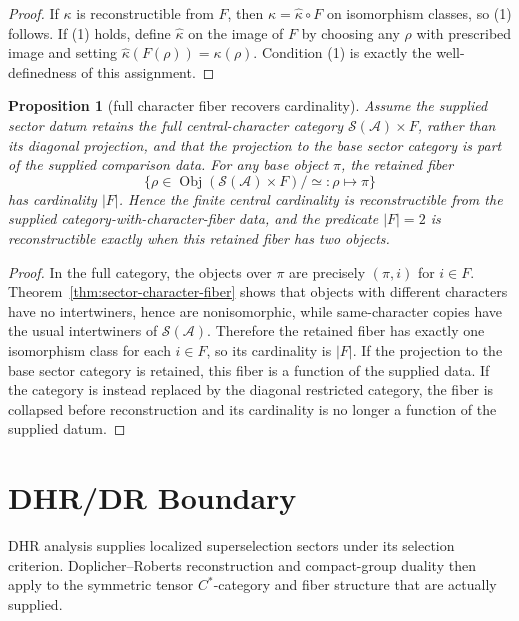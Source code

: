 \documentclass[12pt]{article}
\newtheorem{proposition}{Proposition}
\theoremstyle{remark}
\newcommand{\A}{\mathcal A}
\newcommand{\Obj}{\operatorname{Obj}}
\newcommand{\Sectors}{\mathcal S}
\begin{document}
\begin{proof}
If \(\kappa\) is reconstructible from \(F\), then
\(\kappa=\widehat\kappa\circ F\) on isomorphism classes, so (1) follows.  If
(1) holds, define \(\widehat\kappa\) on the image of \(F\) by choosing any
\(\rho\) with prescribed image and setting
\(\widehat\kappa(F(\rho))=\kappa(\rho)\).  Condition (1) is exactly the
well-definedness of this assignment.
\end{proof}

\begin{proposition}[full character fiber recovers cardinality]
\label{prop:full-character-fiber}
Assume the supplied sector datum retains the full central-character category
\(\Sectors(\A)\times F\), rather than its diagonal projection, and that the
projection to the base sector category is part of the supplied comparison
data.  For any base object \(\pi\), the retained fiber
\[
  \{\rho\in\Obj(\Sectors(\A)\times F)/{\simeq}:\rho\mapsto\pi\}
\]
has cardinality \(|F|\).  Hence the finite central cardinality is
reconstructible from the supplied category-with-character-fiber data, and the
predicate \(|F|=2\) is reconstructible exactly when this retained fiber has
two objects.
\end{proposition}

\begin{proof}
In the full category, the objects over \(\pi\) are precisely \((\pi,i)\) for
\(i\in F\).  Theorem~\ref{thm:sector-character-fiber} shows that objects with
different characters have no intertwiners, hence are nonisomorphic, while
same-character copies have the usual intertwiners of \(\Sectors(\A)\).
Therefore the retained fiber has exactly one isomorphism class for each
\(i\in F\), so its cardinality is \(|F|\).  If the projection to the base
sector category is retained, this fiber is a function of the supplied data.  If
the category is instead replaced by the diagonal restricted category, the fiber
is collapsed before reconstruction and its cardinality is no longer a function
of the supplied datum.
\end{proof}

\section{DHR/DR Boundary}

DHR analysis supplies localized superselection sectors under its selection
criterion.  Doplicher--Roberts reconstruction and compact-group duality then
apply to the symmetric tensor \(C^*\)-category and fiber structure that are
actually supplied.
\end{document}
